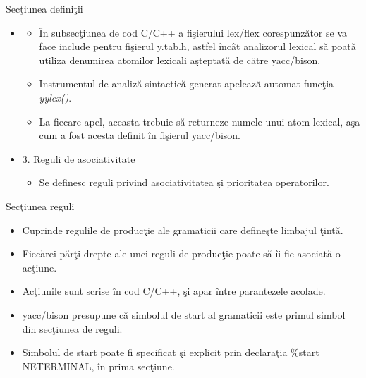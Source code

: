 \documentclass[pdf]{beamer}
\begin{document}
\begin{frame}{Secţiunea definiţii}
\begin{itemize}
	\item[]
	\begin{itemize}
		\item<cir@1->
		În subsecţiunea de cod C/C++ a fişierului lex/flex corespunzător se va face include pentru fişierul y.tab.h, astfel încât analizorul lexical să poată utiliza denumirea atomilor lexicali aşteptată de către yacc/bison.

		\item<cir@1->
		Instrumentul de analiză sintactică generat apelează automat funcţia \textit{yylex()}. 
		
		\item<cir@1->
		La fiecare apel, aceasta trebuie să returneze numele unui atom lexical, aşa cum a fost acesta definit în fişierul yacc/bison.
	\end{itemize}

	\item
	3. Reguli de asociativitate

	\begin{itemize}
		\item<cir@1->
		Se definesc reguli privind asociativitatea şi prioritatea operatorilor.
	\end{itemize}

\end{itemize}
\end{frame}



\begin{frame}{Secţiunea reguli}
\begin{itemize}
	\item
	Cuprinde regulile de producţie ale gramaticii care defineşte limbajul ţintă.

	\item
	Fiecărei părţi drepte ale unei reguli de producţie poate să îi fie asociată o acţiune.

	\item
	Acţiunile sunt scrise în cod C/C++, şi apar între parantezele acolade.

	\item
	yacc/bison presupune că simbolul de start al gramaticii este primul simbol din secţiunea de reguli.

	\item
	Simbolul de start poate fi specificat şi explicit prin declaraţia {\color{red}\%start NETERMINAL}, în prima secţiune.

\end{itemize}
\end{frame}
\end{document}
